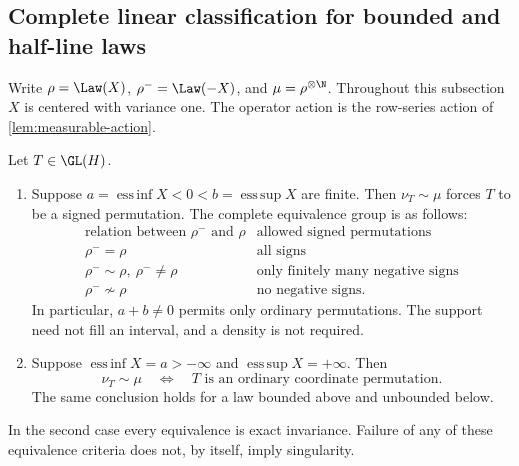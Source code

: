 \subsection{Complete linear classification for bounded and half-line laws}
\label{sec:restricted-support-rigidity}

Write \(\rho=\Law(X)\), \(\rho^-=\Law(-X)\), and
\(\mu=\rho^{\otimes\N}\).
Throughout this subsection \(X\) is centered with variance one.
The operator action is the row-series action of
\cref{lem:measurable-action}.

\begin{theorem}
\label{thm:restricted-support-rigidity}
Let \(T\in\GL(H)\).
\begin{enumerate}
 \item Suppose \(a=\operatorname{ess\,inf}X<0<
 b=\operatorname{ess\,sup}X\) are finite.
 Then \(\nu_T\sim\mu\) forces \(T\) to be a signed permutation.
 The complete equivalence group is as follows:
 \[
 \begin{array}{c|l}
 \text{relation between }\rho^-\text{ and }\rho&\text{allowed signed permutations}\\ \hline
 \rho^-=\rho&\text{all signs}\\
 \rho^-\sim\rho,\ \rho^-\ne\rho&
                  \text{only finitely many negative signs}\\
 \rho^-\not\sim\rho&\text{no negative signs}.
 \end{array}
 \]
 In particular, \(a+b\ne0\) permits only ordinary permutations.
 The support need not fill an interval, and a density is not required.
 \item Suppose \(\operatorname{ess\,inf}X=a>-\infty\) and
 \(\operatorname{ess\,sup}X=+\infty\).
 Then
 \begin{equation}
  \nu_T\sim\mu
   \quad\Longleftrightarrow\quad
  T\text{ is an ordinary coordinate permutation}.
  \label{eq:restricted-halfline-classification}
 \end{equation}
 The same conclusion holds for a law bounded above and unbounded below.
\end{enumerate}
In the second case every equivalence is exact invariance.
Failure of any of these equivalence criteria does not, by itself,
imply singularity.
\end{theorem}
